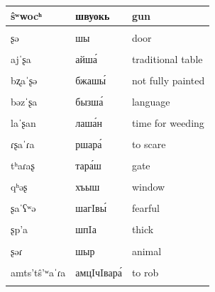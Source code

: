 \documentclass[
]{article}
\begin{document}
\begin{longtable}{l|l|l}
\hline
ŝʷwocʰ & швуокь & gun\\
\hline
\cellcolor{gray!6}{ŝʷəɾ} & \cellcolor{gray!6}{швыр} & \cellcolor{gray!6}{fruit}\\
\hline
ʂə & шы & door\\
\hline
\cellcolor{gray!6}{aˈʂə} & \cellcolor{gray!6}{ашы́} & \cellcolor{gray!6}{cheese}\\
\hline
ajˈʂa & айша́ & traditional table\\
\hline
\cellcolor{gray!6}{ˈajʂa} & \cellcolor{gray!6}{а́йша} & \cellcolor{gray!6}{bitter}\\
\hline
bʐaˈʂə & бжашы́ & not fully painted\\
\hline
\cellcolor{gray!6}{ʂk’ə} & \cellcolor{gray!6}{шкIы} & \cellcolor{gray!6}{hundred}\\
\hline
bəzˈʂa & бызша́ & language\\
\hline
\cellcolor{gray!6}{ɡʷaʂ} & \cellcolor{gray!6}{гваш} & \cellcolor{gray!6}{gate}\\
\hline
laˈʂan & лаша́н & time for weeding\\
\hline
\cellcolor{gray!6}{mʂə} & \cellcolor{gray!6}{мшы} & \cellcolor{gray!6}{bear}\\
\hline
ɾʂaˈɾa & ршара́ & to scare\\
\hline
\cellcolor{gray!6}{nəʂ} & \cellcolor{gray!6}{ныш} & \cellcolor{gray!6}{clay}\\
\hline
tʰaɾaʂ & тара́ш & gate\\
\hline
\cellcolor{gray!6}{qʰʷʂə} & \cellcolor{gray!6}{хъвшы} & \cellcolor{gray!6}{medicine}\\
\hline
qʰəʂ & хъыш & window\\
\hline
\cellcolor{gray!6}{tɕaʂ} & \cellcolor{gray!6}{чаш} & \cellcolor{gray!6}{patty}\\
\hline
ʂaˈʕʷə & шагIвы́ & fearful\\
\hline
\cellcolor{gray!6}{ʂaɡaˈla} & \cellcolor{gray!6}{шагала́} & \cellcolor{gray!6}{pack of jackal}\\
\hline
ʂp’a & шпIа & thick\\
\hline
\cellcolor{gray!6}{ʂʔa} & \cellcolor{gray!6}{шъа} & \cellcolor{gray!6}{document}\\
\hline
ʂəɾ & шыр & animal\\
\hline
\cellcolor{gray!6}{tŝ’ʷa} & \cellcolor{gray!6}{чIва} & \cellcolor{gray!6}{apple}\\
\hline
amts’tŝ’ʷaˈɾa & амцIчIвара́ & to rob\\
\hline
\cellcolor{gray!6}{aˈqʰatŝʷɾa} & \cellcolor{gray!6}{ахъа́чIвра} & \cellcolor{gray!6}{to stitch}\\

\end{longtable}
\end{document}
